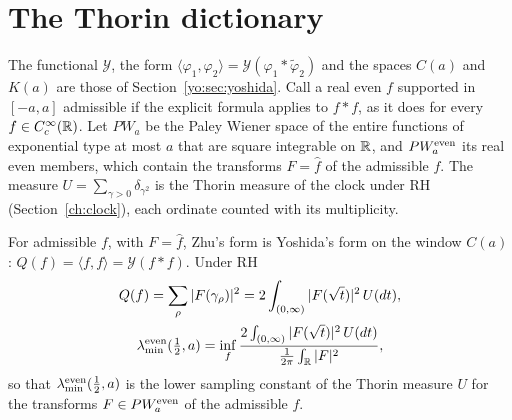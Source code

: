 \section{The Thorin dictionary}\label{zh:sec:dict}

The functional $\mathcal Y$, the form $\langle\varphi_1,\varphi_2\rangle=\mathcal Y(\varphi_1*\widetilde\varphi_2)$ and the spaces $C(a)$ and $K(a)$ are those of Section~\ref{yo:sec:yoshida}. Call a real even $f$ supported in $[-a,a]$ admissible if the explicit formula applies to $f*f$, as it does for every $f\in C_c^\infty(\mathbb{R})$. Let $PW_a$ be the Paley Wiener space of the entire functions of exponential type at most $a$ that are square integrable on $\mathbb{R}$, and $PW_a^{\rm even}$ its real even members, which contain the transforms $F=\widehat f$ of the admissible $f$. The measure $U=\sum_{\gamma>0}\delta_{\gamma^2}$ is the Thorin measure of the clock under RH (Section~\ref{ch:clock}), each ordinate counted with its multiplicity.

\begin{proposition}\label{zh:prop:dict}
For admissible $f$, with $F=\widehat f$, Zhu's form is Yoshida's form on the window $C(a)$: $Q(f)=\langle f,f\rangle=\mathcal Y(f*f)$. Under RH
\[
\begin{gathered}
Q(f)=\sum_\rho|F(\gamma_\rho)|^2=2\int_{(0,\infty)}|F(\sqrt t)|^2\,U(dt),\\
\lambda^{\rm even}_{\min}(\tfrac12,a)=\inf_f\frac{2\int_{(0,\infty)}|F(\sqrt t)|^2\,U(dt)}{\frac1{2\pi}\int_{\mathbb{R}}|F|^2},
\end{gathered}
\]
so that $\lambda^{\rm even}_{\min}(\frac12,a)$ is the lower sampling constant of the Thorin measure $U$ for the transforms $F\in PW_a^{\rm even}$ of the admissible $f$.
\end{proposition}

